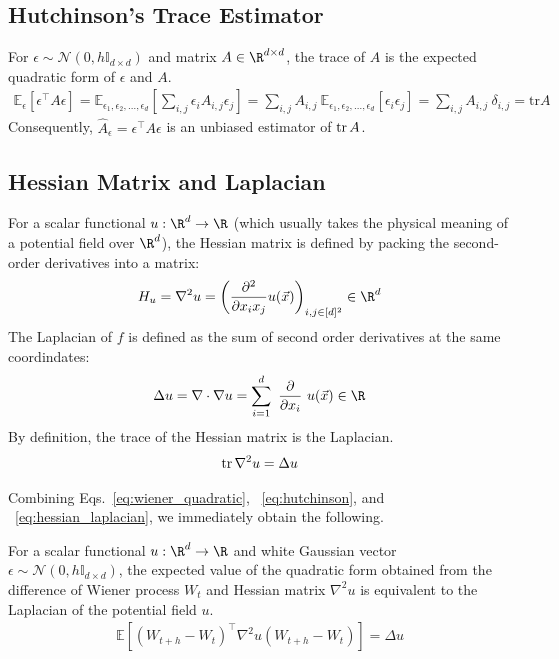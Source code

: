 \documentclass{article}
\begin{document}
\subsection{Hutchinson's Trace Estimator}
\noindent For $\epsilon \sim \mathcal{N}(0, h\mathbb{I}_{d\times d})$ and matrix $A\in \R^{d\times d}$, the trace of $A$ is the expected quadratic form of $\epsilon$ and $A$. 
\begin{equation}
\begin{aligned}\label{eq:hutchinson}
\mathbb{E}_{\epsilon}\left[\epsilon^\top A \epsilon \right]
=
\mathbb{E}_{\epsilon_{1}, \epsilon_{2}, \ldots, \epsilon_{d}}
\left[
\sum_{i,j} \epsilon_i A_{i,j} \epsilon_j
\right]
=
\sum_{i,j} A_{i,j} \ 
\mathbb{E}_{\epsilon_{1}, \epsilon_{2}, \ldots, \epsilon_{d}}\left[
\epsilon_i \epsilon_j
\right]
=
\sum_{i,j} A_{i,j} \ \delta_{i,j}
=
\mathrm{tr} A
\end{aligned}
\end{equation}
Consequently, $\widehat{A}_{\epsilon}=\epsilon^\top A \epsilon$ is an unbiased estimator of $\tr A$. 



\subsection{Hessian Matrix and Laplacian}
\noindent For a scalar functional $u: \R^d \to \R$ (which usually takes the physical meaning of a potential field over $\R^d$), 
the Hessian matrix is defined by packing the second-order derivatives into a matrix:
$$
H_u=\nabla^2 u =\left( \frac{\partial^2}{\partial x_i x_j} u(\vec{x})\right)_{i,j \in [d]^2} \in \R^{d}
$$
\noindent The Laplacian of $f$ is defined as the sum of second order derivatives at the same coordindates:
$$
\Delta u = \nabla \cdot \nabla u = \sum_{i=1}^d\ \frac{\partial}{\partial x_i} \ u(\vec{x}) \in \R
$$
\noindent By definition, the trace of the Hessian matrix is the Laplacian. 
\begin{equation}
\begin{aligned}\label{eq:hessian_laplacian}
\tr \nabla^2 u = \Delta u
\end{aligned}
\end{equation}

Combining Eqs.~\eqref{eq:wiener_quadratic}, ~\eqref{eq:hutchinson}, and ~\eqref{eq:hessian_laplacian}, we immediately obtain the following.
\begin{corollary}
For a scalar functional $u: \R^d \to \R$ and white Gaussian vector $\epsilon \sim \mathcal{N}(0, h\mathbb{I}_{d\times d})$, 
the expected value of the quadratic form obtained from the difference of Wiener process $W_t$ and Hessian matrix $\nabla^2 u$ is equivalent to the Laplacian of the potential field $u$. 
\begin{equation}
\begin{aligned}\label{eq:na}
\mathbb{E}\left[(W_{t+h}-W_t)^\top \nabla^2 u (W_{t+h}-W_t)\right]
= \Delta u
\end{aligned}
    \end{equation}
\end{corollary}
\end{document}
